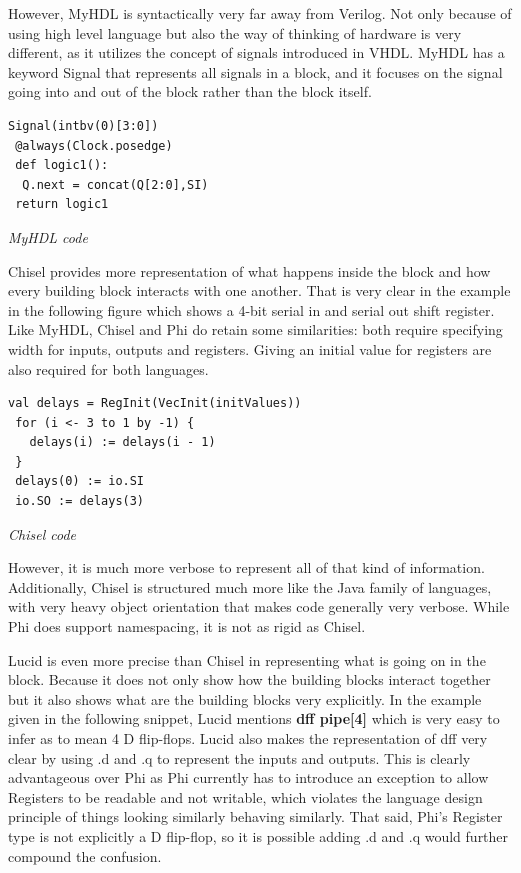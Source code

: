 \documentclass[10pt, two column]{article}
\theoremstyle{definition}
\begin{document}
However, MyHDL is syntactically very far away from Verilog. Not only because of using high level language but also the way of thinking of hardware is very different, as it utilizes the concept of signals introduced in VHDL\cite{VHDLmanual_2009}. MyHDL has a keyword Signal that represents all signals in a block, and it focuses on the signal going into and out of the block rather than the block itself. \cite{MyHDLmanual_2018}\newline

\begin{lstlisting}
Signal(intbv(0)[3:0])
 @always(Clock.posedge)
 def logic1():
  Q.next = concat(Q[2:0],SI)
 return logic1
\end{lstlisting}
\begin{center}
\textit{MyHDL code}
\end{center}

Chisel provides more representation of what happens inside the block and how every building block interacts with one another. That is very clear in the example in the following figure which shows a 4-bit serial in and serial out shift register. Like MyHDL, Chisel and Phi do retain some similarities: both require specifying width for inputs, outputs and registers. Giving an initial value for registers are also required for both languages.\newline

\begin{lstlisting}
val delays = RegInit(VecInit(initValues))
 for (i <- 3 to 1 by -1) {
   delays(i) := delays(i - 1)
 }
 delays(0) := io.SI
 io.SO := delays(3)
\end{lstlisting}
\begin{center}
\textit{Chisel code}
\end{center}

However, it is much more verbose to represent all of that kind of information. Additionally, Chisel is structured much more like the Java family of languages, with very heavy object orientation that makes code generally very verbose. While Phi does support namespacing, it is not as rigid as Chisel.\newline

Lucid is even more precise than Chisel in representing what is going on in the block. Because it does not only show how the building blocks interact together but it also shows what are the building blocks very explicitly. In the example given in the following snippet, Lucid mentions \textbf{dff pipe[4]} which is very easy to infer as to mean 4 D flip-flops. Lucid also makes the representation of dff  very clear by using .d and .q to represent the inputs and outputs. This is clearly advantageous over Phi as Phi currently has to introduce an exception to allow Registers to be readable and not writable, which violates the language design principle of things looking similarly behaving similarly. That said, Phi’s Register type is not explicitly a D flip-flop, so it is possible adding .d and .q would further compound the confusion.\newline
\end{document}
